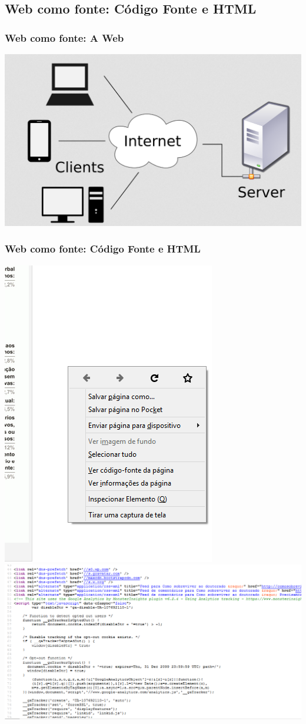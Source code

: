 \documentclass{beamer}
\begin{document}
\subsection{Web como fonte: Código Fonte e HTML} 
\begin{frame}
\frametitle{Web como fonte: A Web}
\includegraphics[width=\textwidth]{ClientServer.png}
\end{frame}
\begin{frame}
\frametitle{Web como fonte: Código Fonte e HTML}
\includegraphics[width=.3\textwidth]{CodigoFonte.png}%
\includegraphics[width=.7\textwidth]{HtmlExemplo.png}
\end{frame}
\end{document}
